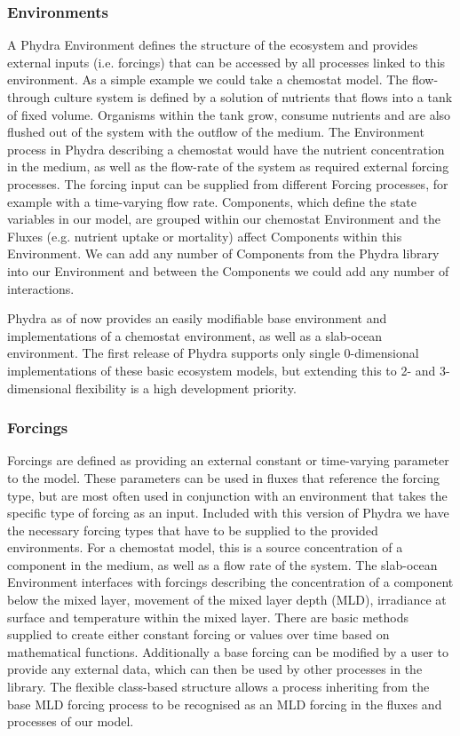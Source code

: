 \subsubsection{Environments} \label{Section:PhysicalEnvironment}

A Phydra Environment defines the structure of the ecosystem and provides external inputs (i.e. forcings) that can be accessed by all processes linked to this environment. As a simple example we could take a chemostat model. The flow-through culture system is defined by a solution of nutrients that flows into a tank of fixed volume. Organisms within the tank grow, consume nutrients and are also flushed out of the system with the outflow of the medium. The Environment process in Phydra describing a chemostat would have the nutrient concentration in the medium, as well as the flow-rate of the system as required external forcing processes. The forcing input can be supplied from different Forcing processes, for example with a time-varying flow rate. Components, which define the state variables in our model, are grouped within our chemostat Environment and the Fluxes (e.g. nutrient uptake or mortality) affect Components within this Environment. We can add any number of Components from the Phydra library into our Environment and between the Components we could add any number of interactions.

Phydra as of now provides an easily modifiable base environment and implementations of a chemostat environment, as well as a slab-ocean environment. The first release of Phydra supports only single 0-dimensional implementations of these basic ecosystem models, but extending this to 2- and 3-dimensional flexibility is a high development priority. 

\subsubsection{Forcings} \label{Section:ForcingSection}

Forcings are defined as providing an external constant or time-varying parameter to the model. These parameters can be used in fluxes that reference the forcing type, but are most often used in conjunction with an environment that takes the specific type of forcing as an input. Included with this version of Phydra we have the necessary forcing types that have to be supplied to the provided environments. For a chemostat model, this is a source concentration of a component in the medium, as well as a flow rate of the system. The slab-ocean Environment interfaces with forcings describing the concentration of a component below the mixed layer, movement of the mixed layer depth (MLD), irradiance at surface and temperature within the mixed layer. There are basic methods supplied to create either constant forcing or values over time based on mathematical functions. Additionally a base forcing can be modified by a user to provide any external data, which can then be used by other processes in the library. The flexible class-based structure allows a process inheriting from the base MLD forcing process to be recognised as an MLD forcing in the fluxes and processes of our model.

